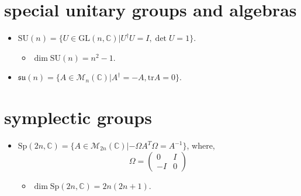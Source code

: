 \section{special unitary groups and algebras}
\begin{itemize}
	\item $\mathrm{SU}(n) = \{U \in \mathrm{GL}(n, \mathbb{C}) | U^\dag U = I, \det U = 1\}$.
	\begin{itemize}
		\item $\dim \mathrm{SU}(n) = n^2 - 1$.
	\end{itemize}
	
	\item $\mathfrak{su}(n) = \{A \in \mathcal{M}_n(\mathbb{C}) | A^\dag = - A, \mathrm{tr} A = 0\}$.
\end{itemize}

\section{symplectic groups}
\begin{itemize}
	\item $\mathrm{Sp}(2 n, \mathbb{C}) = \{A \in \mathcal{M}_{2 n}(\mathbb{C}) | - \Omega A^T \Omega = A^{- 1}\}$, where,
	\begin{equation}
		\Omega = \begin{pmatrix}
			0 & I \\
			- I & 0
		\end{pmatrix}
	\end{equation}
	\begin{itemize}
		\item $\dim \mathrm{Sp}(2 n, \mathbb{C}) = 2 n (2 n + 1)$.
	\end{itemize}
\end{itemize}

